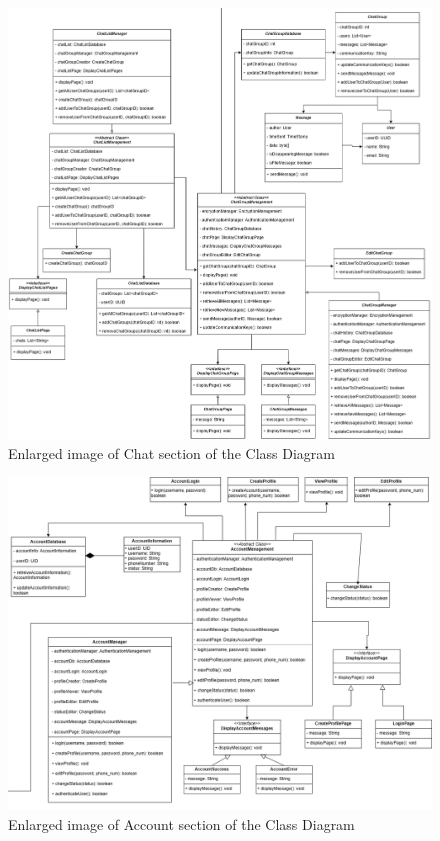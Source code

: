 \documentclass[]{article}
\begin{document}
\begin{figure}[H]
	\centering
	\includegraphics[width=1\textwidth]{chat-class-diagram.png}
	\caption{Enlarged image of Chat section of the Class Diagram}
	\label{fig:class-diagram}
\end{figure}

\begin{figure}[H]
	\centering
	\includegraphics[width=1\textwidth]{account-class-diagram.png}
	\caption{Enlarged image of Account section of the Class Diagram}
	\label{fig:class-diagram}
\end{figure}
\end{document}
